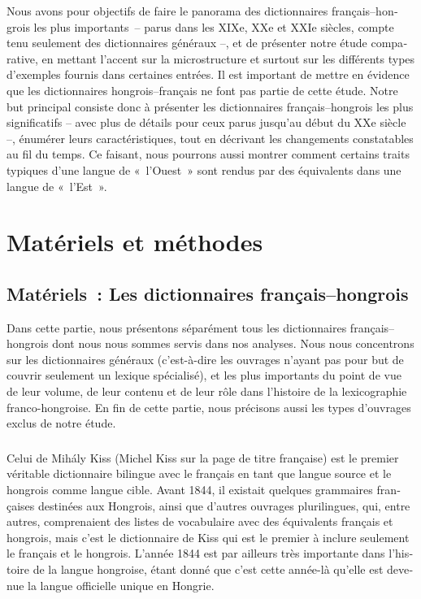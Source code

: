 \documentclass[output=paper,colorlinks,citecolor=brown,arabicfont,chinesefont,booklanguage=french]{langscibook}
\begin{document}
\begin{otherlanguage}{french}
Nous avons pour objectifs de faire le panorama des dictionnaires français–hongrois les plus importants~– parus dans les XIXe, XXe et XXIe siècles, compte tenu seulement des dictionnaires généraux –, et de présenter notre étude comparative, en mettant l’accent sur la microstructure et surtout sur les différents types d’exemples fournis dans certaines entrées. Il est important de mettre en évidence que les dictionnaires hongrois–français ne font pas partie de cette étude. Notre but principal consiste donc à présenter les dictionnaires français–hongrois les plus significatifs – avec plus de détails pour ceux parus jusqu’au début du XXe siècle –, énumérer leurs caractéristiques, tout en décrivant les changements constatables au fil du temps. Ce faisant, nous pourrons aussi montrer comment certains traits typiques d’une langue de «~l’Ouest~» sont rendus par des équivalents dans une langue de «~l’Est~».

\section{Matériels et méthodes}\label{sec:tillinger:2}

\subsection{Matériels~: Les dictionnaires français–hongrois}\label{sec:tillinger:2.1}

Dans cette partie, nous présentons séparément tous les dictionnaires français–hongrois dont nous nous sommes servis dans nos analyses. Nous nous concentrons sur les dictionnaires généraux (c’est-à-dire les ouvrages n’ayant pas pour but de couvrir seulement un lexique spécialisé), et les plus importants du point de vue de leur volume, de leur contenu et de leur rôle dans l’histoire de la lexicographie franco-hongroise. En fin de cette partie, nous précisons aussi les types d’ouvrages exclus de notre étude.

\subsubsection{\citealt{Kiss1844}} \label{sec:tillinger:2.1.1}

Celui de Mihály Kiss (Michel Kiss sur la page de titre française) est le premier véritable dictionnaire bilingue avec le français en tant que langue source et le hongrois comme langue cible. Avant 1844, il existait quelques grammaires françaises destinées aux Hongrois, ainsi que d’autres ouvrages plurilingues, qui, entre autres, comprenaient des listes de vocabulaire avec des équivalents français et hongrois, mais c’est le dictionnaire de Kiss qui est le premier à inclure seulement le français et le hongrois. L’année 1844 est par ailleurs très importante dans l’histoire de la langue hongroise, étant donné que c’est cette année-là qu’elle est devenue la langue officielle unique en Hongrie.


\end{otherlanguage}
\end{document}
